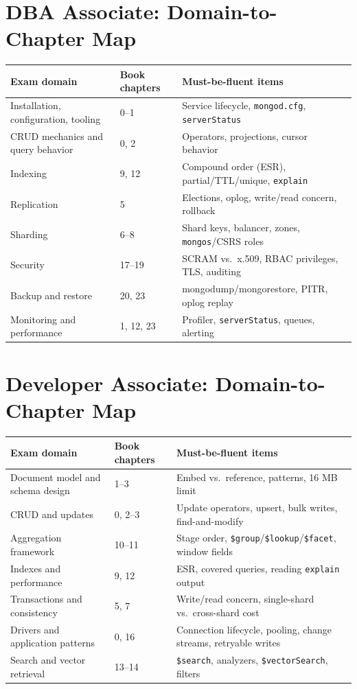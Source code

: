 \section{DBA Associate: Domain-to-Chapter Map}
\begin{center}
\footnotesize
\begin{tabular}{@{}p{4.8cm}p{3.4cm}p{4.6cm}@{}}
\toprule
\textbf{Exam domain} & \textbf{Book chapters} & \textbf{Must-be-fluent items} \\
\midrule
Installation, configuration, tooling & 0--1 & Service lifecycle, \texttt{mongod.cfg}, \texttt{serverStatus} \\
CRUD mechanics and query behavior & 0, 2 & Operators, projections, cursor behavior \\
Indexing & 9, 12 & Compound order (ESR), partial/TTL/unique, \texttt{explain} \\
Replication & 5 & Elections, oplog, write/read concern, rollback \\
Sharding & 6--8 & Shard keys, balancer, zones, \texttt{mongos}/CSRS roles \\
Security & 17--19 & SCRAM vs.\ x.509, RBAC privileges, TLS, auditing \\
Backup and restore & 20, 23 & mongodump/mongorestore, PITR, oplog replay \\
Monitoring and performance & 1, 12, 23 & Profiler, \texttt{serverStatus}, queues, alerting \\
\bottomrule
\end{tabular}
\end{center}

\section{Developer Associate: Domain-to-Chapter Map}
\begin{center}
\footnotesize
\begin{tabular}{@{}p{4.8cm}p{3.4cm}p{4.6cm}@{}}
\toprule
\textbf{Exam domain} & \textbf{Book chapters} & \textbf{Must-be-fluent items} \\
\midrule
Document model and schema design & 1--3 & Embed vs.\ reference, patterns, 16 MB limit \\
CRUD and updates & 0, 2--3 & Update operators, upsert, bulk writes, find-and-modify \\
Aggregation framework & 10--11 & Stage order, \texttt{\$group}/\texttt{\$lookup}/\texttt{\$facet}, window fields \\
Indexes and performance & 9, 12 & ESR, covered queries, reading \texttt{explain} output \\
Transactions and consistency & 5, 7 & Write/read concern, single-shard vs.\ cross-shard cost \\
Drivers and application patterns & 0, 16 & Connection lifecycle, pooling, change streams, retryable writes \\
Search and vector retrieval & 13--14 & \texttt{\$search}, analyzers, \texttt{\$vectorSearch}, filters \\
\bottomrule
\end{tabular}
\end{center}

